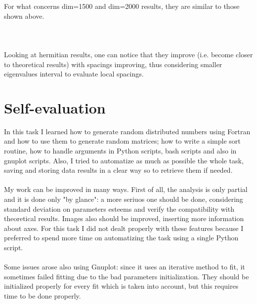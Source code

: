 \documentclass[12pt, a4paper, notitlepage]{report}
\begin{document}
For what concerns dim=1500 and dim=2000 results, they are similar to those shown above.\\ \\ \\ \\
Looking at hermitian results, one can notice that they improve (i.e. become closer to theoretical results) with spacings improving, thus considering smaller eigenvalues interval to evaluate local spacings.

\newpage

\section*{Self-evaluation}
In this task I learned how to generate random distributed numbers using Fortran and how to use them to generate random matrices; how to write a simple sort routine, how to handle arguments in Python scripts, bash scripts and also in gnuplot scripts. Also, I tried to automatize as much as possible the whole task, saving and storing data results in a clear way so to retrieve them if needed.\\ \\
My work can be improved in many ways. First of all, the analysis is only partial and it is done only "by glance": a more seriuos one should be done, considering standard deviation on parameters esteems and verify the compatibility with theoretical results. Images also should be improved, inserting more information about axes. For this task I did not dealt properly with these features because I preferred to spend more time on automatizing the task using a single Python script.\\ \\
Some issues arose also using Gnuplot: since it uses an iterative method to fit, it sometimes failed fitting due to the bad parameters initialization. They should be initialized properly for every fit which is taken into account, but this requires time to be done properly.
\end{document}
